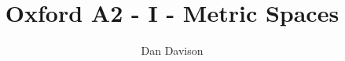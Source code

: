 \documentclass[12pt]{article}
\title{Oxford A2 - I - Metric Spaces
  \footnotetext{\url{https://courses.maths.ox.ac.uk/node/5378}}} \author{Dan Davison}
\author{}
\date{}
\begin{document}

\end{document}
